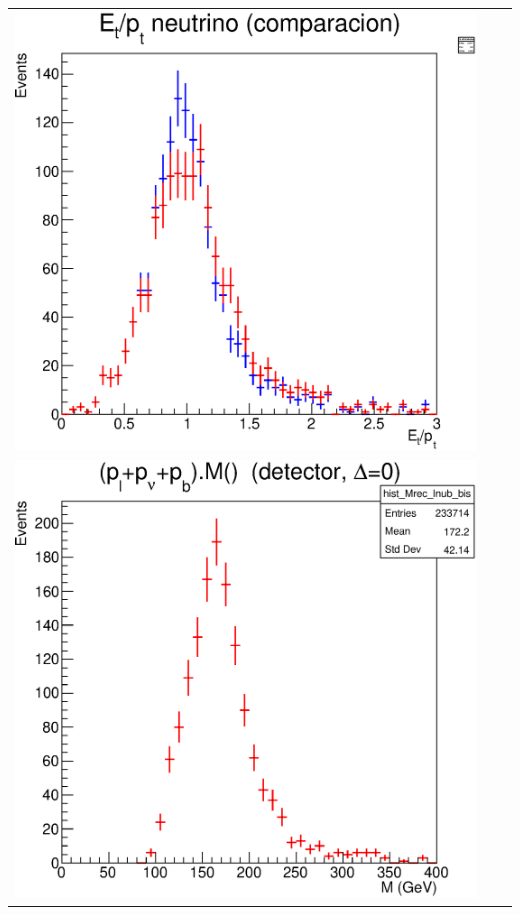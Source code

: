 \documentclass[10pt]{beamer}
\begin{document}
\begin{frame}
\begin{center}
\begin{tabular}{ccc}
				\includegraphics[scale=0.18]{plot-etmisscomparation.eps}
				
			
		 \\
			
			\includegraphics[scale=0.18]{plot-mt-reco-det-bis.eps} &


\end{tabular}
\end{center}
\end{frame}
\end{document}

